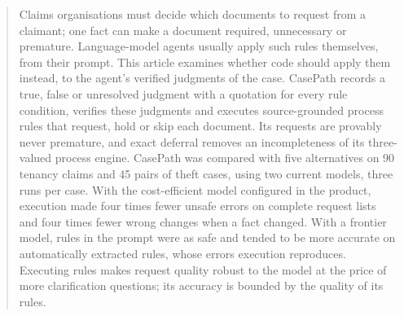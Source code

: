 \begin{abstract}
Claims organisations must decide which documents to request from a claimant; one fact can make a document required, unnecessary or premature. Language-model agents usually apply such rules themselves, from their prompt. This article examines whether code should apply them instead, to the agent's verified judgments of the case. CasePath records a true, false or unresolved judgment with a quotation for every rule condition, verifies these judgments and executes source-grounded process rules that request, hold or skip each document. Its requests are provably never premature, and exact deferral removes an incompleteness of its three-valued process engine. CasePath was compared with five alternatives on 90 tenancy claims and 45 pairs of theft cases, using two current models, three runs per case. With the cost-efficient model configured in the product, execution made four times fewer unsafe errors on complete request lists and four times fewer wrong changes when a fact changed. With a frontier model, rules in the prompt were as safe and tended to be more accurate on automatically extracted rules, whose errors execution reproduces. Executing rules makes request quality robust to the model at the price of more clarification questions; its accuracy is bounded by the quality of its rules.
\end{abstract}
